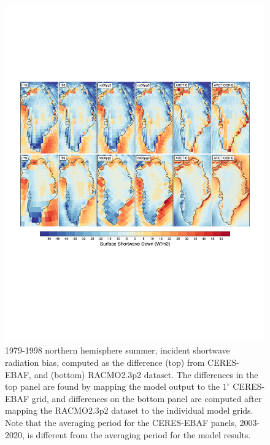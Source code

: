 \documentclass[draft]{agujournal2019}
\begin{document}
\begin{figure}[t]
\begin{center}
         \includegraphics[width=130mm]{figs/temp_contours_diffCERESdiffRACMO_FSDS.pdf}
\end{center}
\caption{1979-1998 northern hemisphere summer, incident shortwave radiation bias, computed as the difference (top) from CERES-EBAF, and (bottom) RACMO2.3p2 dataset. The differences in the top panel are found by mapping the model output to the $1^{\circ}$ CERES-EBAF grid, and differences on the bottom panel are computed after mapping the RACMO2.3p2 dataset to the individual model grids. Note that the averaging period for the CERES-EBAF panels, 2003-2020, is different from the averaging period for the model results.}
\label{fig:FSDS}
\end{figure}
\end{document}
